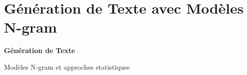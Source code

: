 \documentclass[aspectratio=169,11pt]{beamer}
\begin{document}
\section{Génération de Texte avec Modèles N-gram}
\begin{frame}
    \begin{center}
        \Huge{\textbf{Génération de Texte}}
        \vspace{0.5cm}
        
        \Large{Modèles N-gram et approches statistiques}
        \vspace{1cm}
    \end{center}
\end{frame}

\end{document}
